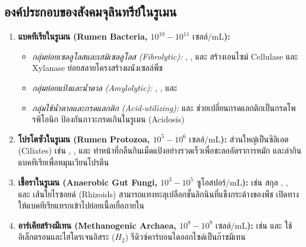 \subsection{องค์ประกอบของสังคมจุลินทรีย์ในรูเมน}
\begin{enumerate}
    \item \textbf{แบคทีเรียในรูเมน (Rumen Bacteria, $10^{10} - 10^{11}\text{ เซลล์/mL}$):}
    \begin{itemize}
        \item \textit{กลุ่มย่อยเซลลูโลสและเฮมิเซลลูโลส (Fibrolytic):} , , และ  สร้างเอนไซม์ Cellulase และ Xylanase ย่อยสลายโครงสร้างผนังเซลล์พืช
        \item \textit{กลุ่มย่อยแป้งและน้ำตาล (Amylolytic):} , , และ 
        \item \textit{กลุ่มใช้น้ำตาลและกรดแลกติก (Acid-utilizing):}  และ  ช่วยเปลี่ยนกรดแลกติกเป็นกรดโพรพิโอนิก ป้องกันภาวะกรดเกินในรูเมน (Acidosis)
    \end{itemize}
    \item \textbf{โปรโตซัวในรูเมน (Rumen Protozoa, $10^5 - 10^6\text{ เซลล์/mL}$):} ส่วนใหญ่เป็นซิลิเอต (Ciliates) เช่น , , และ  ทำหน้าที่กลืนกินเม็ดแป้งอย่างรวดเร็วเพื่อชะลออัตราการหมัก และล่ากินแบคทีเรียเพื่อหมุนเวียนโปรตีน
    \item \textbf{เชื้อราในรูเมน (Anaerobic Gut Fungi, $10^3 - 10^5\text{ ซูโอสปอร์/mL}$):} เช่น สกุล , , และ  เส้นใยไรซอยด์ (Rhizoids) สามารถแทงทะลุเปลือกชั้นลิกนินที่แข็งกระด้างของพืช เปิดทางให้แบคทีเรียแทรกเข้าไปย่อยเนื้อเยื่อภายใน
    \item \textbf{อาร์เคียสร้างมีเทน (Methanogenic Archaea, $10^8 - 10^9\text{ เซลล์/mL}$):} เช่น  และ  ใช้อิเล็กตรอนและไฮโดรเจนอิสระ ($H_2$) รีดิวซ์คาร์บอนไดออกไซด์เป็นก๊าซมีเทน
\end{enumerate}

